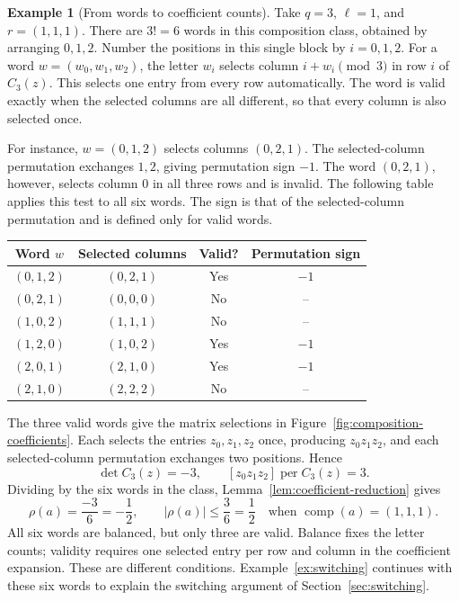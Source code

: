 \documentclass[11pt,a4paper]{article}
\numberwithin{equation}{section}
\numberwithin{figure}{section}
\numberwithin{table}{section}
\numberwithin{footnote}{section}
\theoremstyle{informal}\newtheorem*{informaltheorem}{Informal theorem}
\theoremstyle{definition}\newtheorem{example}{Example}[section]
\theoremstyle{remark}\newtheorem{remark}[theorem]{Remark}
\newcommand{\per}{\operatorname{per}}
\begin{document}
\begin{example}[From words to coefficient counts]\label{ex:coefficient-counting}
Take \(q=3\), \(\ell=1\), and \(r=(1,1,1)\). There are
\(3!=6\) words in this composition class, obtained by arranging
\(0,1,2\). Number the positions in this single block by
\(i=0,1,2\). For a word \(w=(w_0,w_1,w_2)\), the letter
\(w_i\) selects column \(i+w_i\pmod3\) in row \(i\) of
\(C_3(z)\). This selects one entry from every row automatically.
The word is valid exactly when the selected columns are all different,
so that every column is also selected once.

For instance, \(w=(0,1,2)\) selects columns \((0,2,1)\).
The selected-column permutation exchanges \(1,2\), giving
permutation sign \(-1\). The word \((0,2,1)\), however,
selects column \(0\) in all three rows and is invalid.
The following table applies this test to all six words. The sign
is that of the selected-column permutation and is defined only
for valid words.
\begin{center}
\renewcommand{\arraystretch}{1.1}
\begin{tabular}{@{}cccc@{}}
\toprule
Word \(w\) & Selected columns & Valid? & Permutation sign \\
\midrule
\((0,1,2)\) & \((0,2,1)\) & Yes & \(-1\) \\
\((0,2,1)\) & \((0,0,0)\) & No  & \(\text{--}\) \\
\((1,0,2)\) & \((1,1,1)\) & No  & \(\text{--}\) \\
\((1,2,0)\) & \((1,0,2)\) & Yes & \(-1\) \\
\((2,0,1)\) & \((2,1,0)\) & Yes & \(-1\) \\
\((2,1,0)\) & \((2,2,2)\) & No  & \(\text{--}\) \\
\bottomrule
\end{tabular}
\end{center}
The three valid words give the matrix selections in
Figure~\ref{fig:composition-coefficients}. Each selects the entries
\(z_0,z_1,z_2\) once, producing \(z_0z_1z_2\), and each
selected-column permutation exchanges two positions. Hence
\begin{equation}
 [z_0z_1z_2]\det C_3(z)=-3,\qquad
 [z_0z_1z_2]\per C_3(z)=3.
\end{equation}
Dividing by the six words in the class,
Lemma~\ref{lem:coefficient-reduction} gives
\begin{equation}
 \rho(a)=\frac{-3}{6}=-\frac12,\qquad
 |\rho(a)|\leq\frac36=\frac12
 \quad\text{when }\operatorname{comp}(a)=(1,1,1).
\end{equation}
All six words are balanced, but only three are valid. Balance fixes
the letter counts; validity requires one selected entry per row and
column in the coefficient expansion. These are different conditions.
Example~\ref{ex:switching} continues with these six words to explain
the switching argument of Section~\ref{sec:switching}.
\end{example}
\end{document}

